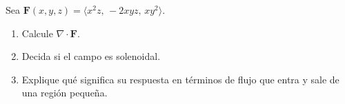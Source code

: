 Sea $\mathbf{F}(x,y,z)=\langle x^2z,\,-2xyz,\,xy^2\rangle$.
\begin{enumerate}
    \item Calcule $\nabla\cdot\mathbf{F}$.
    \item Decida si el campo es solenoidal.
    \item Explique qué significa su respuesta en términos de flujo que entra y sale de una región pequeña.
\end{enumerate}
